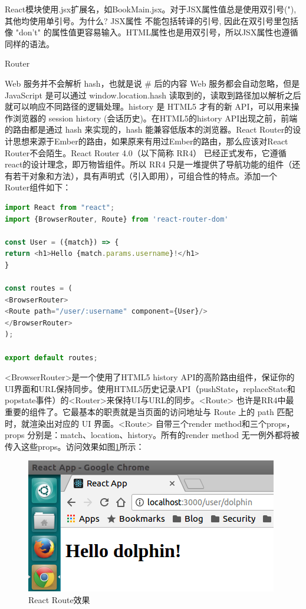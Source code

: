 \documentclass[11pt,fleqn]{book}
\makeatletter
\numberwithin{dummy}{section}
\theoremstyle{ocrenumbox}
\theoremstyle{blacknumex}
\theoremstyle{blacknumbox}
\theoremstyle{ocrenum}
\renewcommand{\subsection}{\@startsection {subsection}{2}{\z@}
	{-3ex \@plus -0.1ex \@minus -.4ex}
	{0.5ex \@plus.2ex }
	{\normalfont\sffamily\bfseries}}
\makeatother
\begin{document}
React模块使用.jsx扩展名，如BookMain.jsx。对于JSX属性值总是使用双引号("), 其他均使用单引号。为什么? JSX属性 不能包括转译的引号, 因此在双引号里包括像 "don't" 的属性值更容易输入。HTML属性也是用双引号，所以JSX属性也遵循同样的语法。

\subsection{Router}

Web 服务并不会解析 hash，也就是说 \# 后的内容 Web 服务都会自动忽略，但是 JavaScript 是可以通过 window.location.hash 读取到的，读取到路径加以解析之后就可以响应不同路径的逻辑处理。history 是 HTML5 才有的新 API，可以用来操作浏览器的 session history (会话历史)。在HTML5的history API出现之前，前端的路由都是通过 hash 来实现的，hash 能兼容低版本的浏览器。React Router的设计思想来源于Ember的路由，如果原来有用过Ember的路由，那么应该对React Router不会陌生。React Router 4.0（以下简称 RR4） 已经正式发布，它遵循react的设计理念，即万物皆组件。所以 RR4 只是一堆提供了导航功能的组件（还有若干对象和方法），具有声明式（引入即用），可组合性的特点。添加一个Router组件如下：

\begin{lstlisting}[language=Javascript]
import React from "react";
import {BrowserRouter, Route} from 'react-router-dom'

const User = ({match}) => {
return <h1>Hello {match.params.username}!</h1>
}

const routes = (
<BrowserRouter>
<Route path="/user/:username" component={User}/>
</BrowserRouter>
);

export default routes;
\end{lstlisting}

<BrowserRouter>是一个使用了HTML5 history API的高阶路由组件，保证你的UI界面和URL保持同步。使用HTML5历史记录API（pushState，replaceState和popstate事件）的<Router>来保持UI与URL的同步。<Route> 也许是RR4中最重要的组件了。它最基本的职责就是当页面的访问地址与 Route 上的 path 匹配时，就渲染出对应的 UI 界面。<Route> 自带三个render method和三个props，props 分别是：match、location、history。所有的render method 无一例外都将被传入这些props。访问效果如图\ref{fig:firstroute}所示：

\begin{figure}[htbp]
	\centering
	\includegraphics[scale=0.6]{firstroute.png}
	\caption{React Route效果}
	\label{fig:firstroute}
\end{figure}
\end{document}
